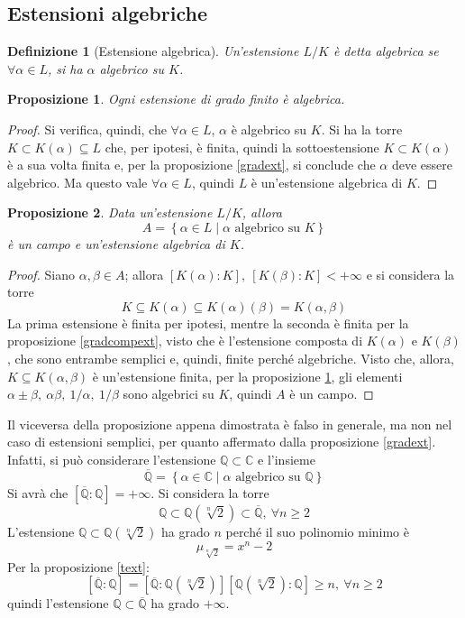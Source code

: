 \documentclass[12pt]{scrartcl}
\theoremstyle{style}
\newtheorem{definizione}{Definizione}[section]
\newtheorem{prop}{Proposizione}[section]
\numberwithin{equation}{subsection}
\begin{document}
\subsection{Estensioni algebriche}
\begin{definizione}
	[Estensione algebrica]
	Un'estensione $L / K$ \`e detta \textit{algebrica} se $\forall  \alpha  \in L$, si ha $\alpha $ algebrico su $K$.
\end{definizione}
\begin{prop}\label{algextfin}
	Ogni estensione di grado finito \`e algebrica.
\end{prop}
\begin{proof}
	Si verifica, quindi, che $\forall \alpha \in L$, $\alpha $ \`e algebrico su $K$.
	Si ha la torre $K \subset K(\alpha ) \subseteq L$ che, per ipotesi, \`e finita, quindi la sottoestensione $K \subset K(\alpha )$ \`e a sua volta finita e, per la proposizione \ref{gradext}, si conclude che $\alpha $ deve essere algebrico.
	Ma questo vale $\forall \alpha  \in L$, quindi $L$ \`e un'estensione algebrica di $K$.
\end{proof}
\begin{prop}
	Data un'estensione $L / K$, allora 
	\[
	A = \left\{ \alpha  \in L  \mid \alpha  \text{ algebrico su } K \right\} 
	\] 
	\`e un campo e un'estensione algebrica di $K$.
\end{prop}
\begin{proof}
	Siano $\alpha , \beta  \in  A$; allora $[K(\alpha ): K ], \ [ K(\beta):  K] < + \infty$ e si considera la torre
	\[
	K \subseteq K(\alpha ) \subseteq K(\alpha )(\beta ) = K(\alpha ,\beta )
	\] 
	La prima estensione \`e finita per ipotesi, mentre la seconda \`e finita per la proposizione \ref{gradcompext}, visto che \`e l'estensione composta di $K(\alpha )$ e $K(\beta )$, che sono entrambe semplici e, quindi, finite perch\'e algebriche.
	Visto che, allora, $K \subseteq K(\alpha ,\beta )$ \`e un'estensione finita, per la proposizione \ref{algextfin}, gli elementi $\alpha \pm \beta, \ \alpha \beta ,\ 1 / \alpha , \ 1 / \beta  $ sono algebrici su $K$, quindi $A$ \`e un campo.
\end{proof}
	Il viceversa della proposizione appena dimostrata \`e falso in generale, ma non nel caso di estensioni semplici, per quanto affermato dalla proposizione \ref{gradext}.
	Infatti, si pu\`o considerare l'estensione $\mathbb{Q}\subset \mathbb{C}$ e l'insieme 
	\[
	\overline{\mathbb{Q}}= \left\{ \alpha  \in \mathbb{C} \mid \alpha \text{ algebrico su }\mathbb{Q} \right\} 
	\] 
	Si avr\`a che $[\overline{\mathbb{Q}}: \mathbb{Q}] = + \infty$.
	Si considera la torre 
	\[
		\mathbb{Q}\subset \mathbb{Q}(\sqrt[n]{2} ) \subset \overline{\mathbb{Q}}, \ \forall n \ge 2
	\] 
	L'estensione $\mathbb{Q}\subset \mathbb{Q}(\sqrt[n]{2}) $ ha grado $n$ perch\'e il suo polinomio minimo \`e 
	\[
		\mu _{\sqrt[n]{2} } = x^n -2
	\] 
	Per la proposizione \ref{text}:
	\[
		[\overline{\mathbb{Q}}:\mathbb{Q}] = [\overline{\mathbb{Q}}:\mathbb{Q}(\sqrt[n]{2} )] [ \mathbb{Q}(\sqrt[n]{2} ):\mathbb{Q}] \ge n, \ \forall n \ge 2
	\] 
	quindi l'estensione $\mathbb{Q}\subset \overline{\mathbb{Q}}$ ha grado $+\infty$.
\end{document}

